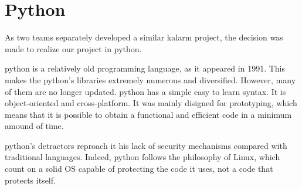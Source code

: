 \section{Python}
As two teams separately developed a similar \gls{kalarm} project, the decision was made to realize our project in python.

\gls{python} is a relatively old programming language, as it appeared in 1991. This makes the \gls{python}'s libraries extremely numerous and diversified. However, many of them are no longer updated. \gls{python} has a simple easy to learn syntax. It is object-oriented and cross-platform. It was mainly disigned for prototyping, which means that it is possible to obtain a functional and efficient code in a minimum amound of time.

\gls{python}'s detractors reproach it his lack of security mechanisms compared with traditional languages. Indeed, \gls{python} follows the philosophy of Linux, which count on a solid OS capable of protecting the code it uses, not a code that protects itself.